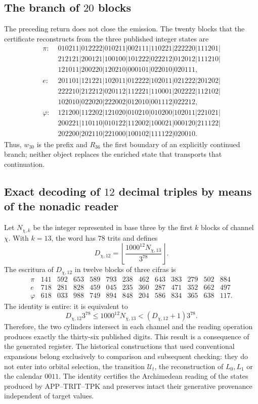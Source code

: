 \subsection{The branch of \(20\) blocks}

The preceding return does not close the emission. The twenty blocks that the
certificate reconstructs from the three published integer states are
\begin{align*}
\pi:\;&010211|012222|010211|002111|110221|222220|111201|\\
&212121|200121|100100|101222|022212|012012|111210|\\
&121011|200220|120210|000101|022010|020111,\\[2pt]
e:\;&201101|121221|102011|012222|102011|021222|201202|\\
&222210|212212|020112|112221|110001|202222|112102|\\
&102010|022020|222002|012010|001112|022212,\\[2pt]
\varphi:\;&121200|112202|121020|010210|010200|102011|221021|\\
&200221|110110|010122|112002|100021|000120|211122|\\
&202200|202110|221000|100102|111122|020010.
\end{align*}
Thus, \(w_{30}\) is the prefix and \(R_{36}\) the first boundary of an
explicitly continued branch; neither object replaces the enriched state
that transports that continuation.

\subsection{Exact decoding of \(12\) decimal triples by means of the nonadic reader}

Let \(N_{\chi,k}\) be the integer represented in base three by the first \(k\)
blocks of channel \(\chi\). With \(k=13\), the word has \(78\) trits and
defines
\[
D_{\chi,12}
=\left\lfloor\frac{1000^{12}N_{\chi,13}}{3^{78}}\right\rfloor.
\]
The escritura of \(D_{\chi,12}\) in twelve blocks of three cifras is
\[
\begin{array}{c|rrrrrrrrrrrr}
\pi&141&592&653&589&793&238&462&643&383&279&502&884\\
e&718&281&828&459&045&235&360&287&471&352&662&497\\
\varphi&618&033&988&749&894&848&204&586&834&365&638&117.
\end{array}
\]
The identity is entire: it is equivalent to
\[
D_{\chi,12}3^{78}
\le 1000^{12}N_{\chi,13}
<(D_{\chi,12}+1)3^{78}.
\]
Therefore, the two cylinders intersect in each channel and the reading
operation produces exactly the thirty-six published digits. This
result is a consequence of the generated register. The historical
constructions that used conventional expansions belong exclusively
to comparison and subsequent checking: they do not enter into orbital
selection, the transition \(\mathcal U_t\), the reconstruction of
\(L_0,L_1\) or the calendar \(0011\). The identity certifies the Archimedean
reading of the states produced by APP--TRIT--TPK and preserves intact
their generative provenance independent of target values.

